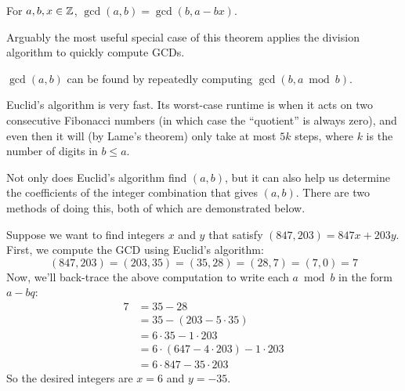 \documentclass[../m55main.tex]{chapters}
\begin{document}
\begin{theorem}
    For $a,b,x \in \mathbb{Z}$, $\gcd (a,b) = \gcd (b, a - bx)$.
\end{theorem}


Arguably the most useful special case of this theorem applies the division algorithm to quickly compute GCDs.

\begin{corollary}
    $\gcd (a,b)$ can be found by repeatedly computing $\gcd (b, a \bmod b)$.
\end{corollary}


Euclid's algorithm is very fast.
Its worst-case runtime is when it acts on two consecutive Fibonacci numbers (in which case the ``quotient'' is always zero), and even then it will (by Lame's theorem) only take at most $5k$ steps, where $k$ is the number of digits in $b \leq a$.

Not only does Euclid's algorithm find $(a,b)$, but it can also help us determine the coefficients of the integer combination that gives $(a,b)$.
There are two methods of doing this, both of which are demonstrated below.

\begin{example}
    Suppose we want to find integers $x$ and $y$ that satisfy $(847, 203) = 847x + 203y$.
    First, we compute the GCD using Euclid's algorithm:
    \[ (847,203) = (203,35) = (35,28) = (28,7) = (7,0) = 7 \]
    Now, we'll back-trace the above computation to write each $a \bmod b$ in the form $a - bq$:
    \begin{align*}
        7 &= 35 - 28 \\
        &= 35 - (203 - 5 \cdot 35) \\
        &= 6 \cdot 35 - 1 \cdot 203 \\
        &= 6 \cdot (647 - 4 \cdot 203) - 1 \cdot 203 \\
        &= 6 \cdot 847 - 35 \cdot 203
    \end{align*}
    So the desired integers are $x = 6$ and $y = -35$.
\end{example}
\end{document}
